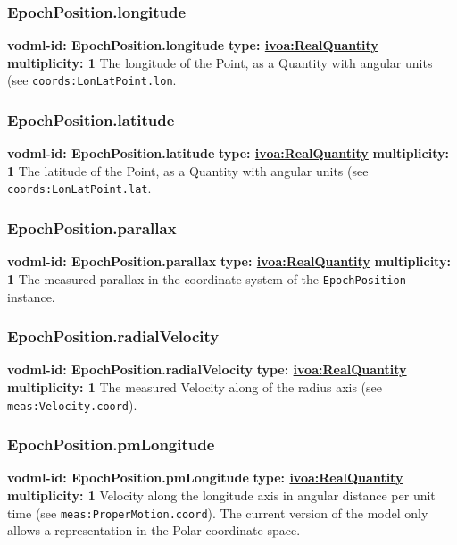     \subsubsection{EpochPosition.longitude}
      \textbf{vodml-id: EpochPosition.longitude} \newline
      \textbf{type: \hyperref[sect:ivoa]{ivoa:RealQuantity}} \newline
      \textbf{multiplicity: 1} \newline 
      The longitude of the Point, as a Quantity with angular units (see \texttt{coords:LonLatPoint.lon}.

    \subsubsection{EpochPosition.latitude}
      \textbf{vodml-id: EpochPosition.latitude} \newline
      \textbf{type: \hyperref[sect:ivoa]{ivoa:RealQuantity}} \newline
      \textbf{multiplicity: 1} \newline 
      The latitude of the Point, as a Quantity with angular units (see \texttt{coords:LonLatPoint.lat}.

    \subsubsection{EpochPosition.parallax}
      \textbf{vodml-id: EpochPosition.parallax} \newline
      \textbf{type: \hyperref[sect:ivoa]{ivoa:RealQuantity}} \newline
      \textbf{multiplicity: 1} \newline 
      The measured parallax in the coordinate system of the \texttt{EpochPosition} instance.

    \subsubsection{EpochPosition.radialVelocity}
      \textbf{vodml-id: EpochPosition.radialVelocity} \newline
      \textbf{type: \hyperref[sect:ivoa]{ivoa:RealQuantity}} \newline
      \textbf{multiplicity: 1} \newline 
      The measured Velocity along of the radius axis (see \texttt{meas:Velocity.coord}).

    \subsubsection{EpochPosition.pmLongitude}
      \textbf{vodml-id: EpochPosition.pmLongitude} \newline
      \textbf{type: \hyperref[sect:ivoa]{ivoa:RealQuantity}} \newline
      \textbf{multiplicity: 1} \newline 
      Velocity along the longitude axis in angular distance per unit time (see \texttt{meas:ProperMotion.coord}). The current version of the model only allows a representation in the Polar coordinate space.

